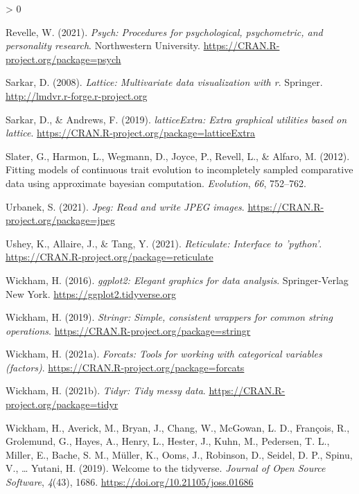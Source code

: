 \documentclass[
  english,
  man]{apa6}
\newlength{\cslhangindent}
\newenvironment{CSLReferences}[2] %
 {%
  \setlength{\parindent}{0pt}
  \ifodd #1 \everypar{\setlength{\hangindent}{\cslhangindent}}\ignorespaces\fi
  \ifnum #2 > 0
  \setlength{\parskip}{#2\baselineskip}
  \fi
 }%
 {}
\begin{document}
\begin{CSLReferences}{1}{0}
\leavevmode\hypertarget{ref-R-psych}{}%
Revelle, W. (2021). \emph{Psych: Procedures for psychological, psychometric, and personality research}. Northwestern University. \url{https://CRAN.R-project.org/package=psych}

\leavevmode\hypertarget{ref-R-lattice}{}%
Sarkar, D. (2008). \emph{Lattice: Multivariate data visualization with r}. Springer. \url{http://lmdvr.r-forge.r-project.org}

\leavevmode\hypertarget{ref-R-latticeExtra}{}%
Sarkar, D., \& Andrews, F. (2019). \emph{latticeExtra: Extra graphical utilities based on lattice}. \url{https://CRAN.R-project.org/package=latticeExtra}

\leavevmode\hypertarget{ref-R-geiger_c}{}%
Slater, G., Harmon, L., Wegmann, D., Joyce, P., Revell, L., \& Alfaro, M. (2012). Fitting models of continuous trait evolution to incompletely sampled comparative data using approximate bayesian computation. \emph{Evolution}, \emph{66}, 752--762.

\leavevmode\hypertarget{ref-R-jpeg}{}%
Urbanek, S. (2021). \emph{Jpeg: Read and write JPEG images}. \url{https://CRAN.R-project.org/package=jpeg}

\leavevmode\hypertarget{ref-R-reticulate}{}%
Ushey, K., Allaire, J., \& Tang, Y. (2021). \emph{Reticulate: Interface to 'python'}. \url{https://CRAN.R-project.org/package=reticulate}

\leavevmode\hypertarget{ref-R-ggplot2}{}%
Wickham, H. (2016). \emph{ggplot2: Elegant graphics for data analysis}. Springer-Verlag New York. \url{https://ggplot2.tidyverse.org}

\leavevmode\hypertarget{ref-R-stringr}{}%
Wickham, H. (2019). \emph{Stringr: Simple, consistent wrappers for common string operations}. \url{https://CRAN.R-project.org/package=stringr}

\leavevmode\hypertarget{ref-R-forcats}{}%
Wickham, H. (2021a). \emph{Forcats: Tools for working with categorical variables (factors)}. \url{https://CRAN.R-project.org/package=forcats}

\leavevmode\hypertarget{ref-R-tidyr}{}%
Wickham, H. (2021b). \emph{Tidyr: Tidy messy data}. \url{https://CRAN.R-project.org/package=tidyr}

\leavevmode\hypertarget{ref-R-tidyverse}{}%
Wickham, H., Averick, M., Bryan, J., Chang, W., McGowan, L. D., François, R., Grolemund, G., Hayes, A., Henry, L., Hester, J., Kuhn, M., Pedersen, T. L., Miller, E., Bache, S. M., Müller, K., Ooms, J., Robinson, D., Seidel, D. P., Spinu, V., \ldots{} Yutani, H. (2019). Welcome to the {tidyverse}. \emph{Journal of Open Source Software}, \emph{4}(43), 1686. \url{https://doi.org/10.21105/joss.01686}


\end{CSLReferences}
\end{document}
